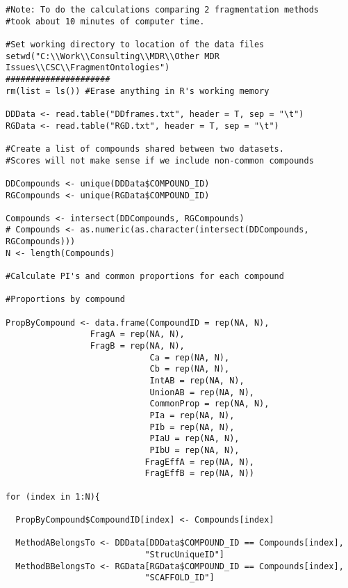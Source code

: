 \documentclass[11pt,letterpaper]{article}
\begin{document}
\begin{verbatim}
#Note: To do the calculations comparing 2 fragmentation methods
#took about 10 minutes of computer time.

#Set working directory to location of the data files
setwd("C:\\Work\\Consulting\\MDR\\Other MDR Issues\\CSC\\FragmentOntologies")
#####################
rm(list = ls()) #Erase anything in R's working memory

DDData <- read.table("DDframes.txt", header = T, sep = "\t")
RGData <- read.table("RGD.txt", header = T, sep = "\t")

#Create a list of compounds shared between two datasets.
#Scores will not make sense if we include non-common compounds

DDCompounds <- unique(DDData$COMPOUND_ID)
RGCompounds <- unique(RGData$COMPOUND_ID)

Compounds <- intersect(DDCompounds, RGCompounds)
# Compounds <- as.numeric(as.character(intersect(DDCompounds, RGCompounds)))
N <- length(Compounds)

#Calculate PI's and common proportions for each compound
  
#Proportions by compound

PropByCompound <- data.frame(CompoundID = rep(NA, N),
			     FragA = rep(NA, N),
			     FragB = rep(NA, N),
                             Ca = rep(NA, N),
                             Cb = rep(NA, N),
                             IntAB = rep(NA, N),
                             UnionAB = rep(NA, N),
                             CommonProp = rep(NA, N),
                             PIa = rep(NA, N),
                             PIb = rep(NA, N),
                             PIaU = rep(NA, N),
                             PIbU = rep(NA, N),
                            FragEffA = rep(NA, N),
                            FragEffB = rep(NA, N))

for (index in 1:N){
  
  PropByCompound$CompoundID[index] <- Compounds[index]
  
  MethodABelongsTo <- DDData[DDData$COMPOUND_ID == Compounds[index],
                            "StrucUniqueID"]
  MethodBBelongsTo <- RGData[RGData$COMPOUND_ID == Compounds[index],
                            "SCAFFOLD_ID"]
							

\end{verbatim}
\end{document}
